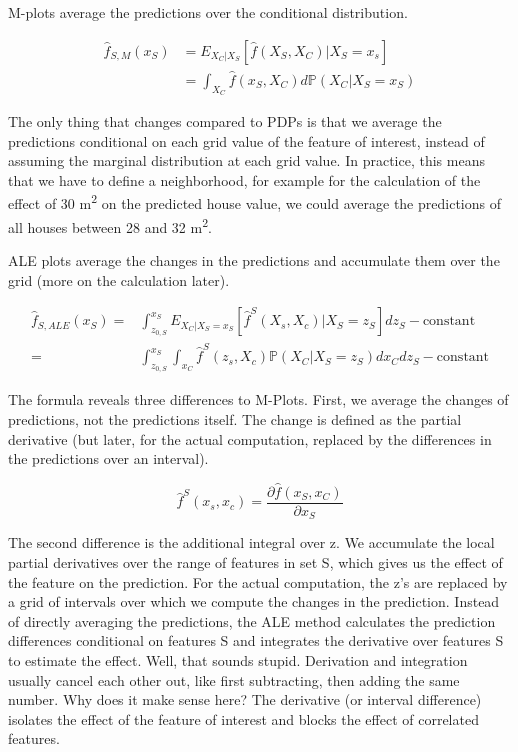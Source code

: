 \documentclass[12pt,]{krantz}
\begin{document}
M-plots average the predictions over the conditional distribution.

\begin{align*}\hat{f}_{S,M}(x_S)&=E_{X_C|X_S}\left[\hat{f}(X_S,X_C)|X_S=x_s\right]\\&=\int_{X_C}\hat{f}(x_S, X_C)d\mathbb{P}(X_C|X_S = x_S)\end{align*}

The only thing that changes compared to PDPs is that we average the
predictions conditional on each grid value of the feature of interest,
instead of assuming the marginal distribution at each grid value. In
practice, this means that we have to define a neighborhood, for example
for the calculation of the effect of 30 m\textsuperscript{2} on the
predicted house value, we could average the predictions of all houses
between 28 and 32 m\textsuperscript{2}.

ALE plots average the changes in the predictions and accumulate them
over the grid (more on the calculation later).

\begin{align*}
\hat{f}_{S,ALE}(x_S)=&\int_{z_{0,S}}^{x_S}E_{X_C|X_S = x_S}\left[\hat{f}^S(X_s,X_c)|X_S=z_S\right]dz_S-\text{constant}\\
 = & \int_{z_{0,S}}^{x_S}\int_{x_C}\hat{f}^S(z_s,X_c)\mathbb{P}(X_C|X_S = z_S)d{}x_C{}dz_S-\text{constant}
\end{align*}

The formula reveals three differences to M-Plots. First, we average the
changes of predictions, not the predictions itself. The change is
defined as the partial derivative (but later, for the actual
computation, replaced by the differences in the predictions over an
interval).

\[\hat{f}^S(x_s,x_c)=\frac{\partial\hat{f}(x_S,x_C)}{\partial{}x_S}\]

The second difference is the additional integral over z. We accumulate
the local partial derivatives over the range of features in set S, which
gives us the effect of the feature on the prediction. For the actual
computation, the z's are replaced by a grid of intervals over which we
compute the changes in the prediction. Instead of directly averaging the
predictions, the ALE method calculates the prediction differences
conditional on features S and integrates the derivative over features S
to estimate the effect. Well, that sounds stupid. Derivation and
integration usually cancel each other out, like first subtracting, then
adding the same number. Why does it make sense here? The derivative (or
interval difference) isolates the effect of the feature of interest and
blocks the effect of correlated features.
\end{document}
